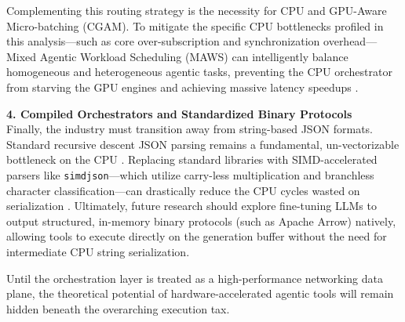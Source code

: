 \documentclass[10pt, letterpaper]{article}
\begin{document}
Complementing this routing strategy is the necessity for CPU and GPU-Aware Micro-batching (CGAM). To mitigate the specific CPU bottlenecks profiled in this analysis---such as core over-subscription and synchronization overhead---Mixed Agentic Workload Scheduling (MAWS) can intelligently balance homogeneous and heterogeneous agentic tasks, preventing the CPU orchestrator from starving the GPU engines and achieving massive latency speedups \cite{cpu_centric}.

\textbf{4. Compiled Orchestrators and Standardized Binary Protocols} \\
Finally, the industry must transition away from string-based JSON formats. Standard recursive descent JSON parsing remains a fundamental, un-vectorizable bottleneck on the CPU \cite{simdjson}. Replacing standard libraries with SIMD-accelerated parsers like \texttt{simdjson}---which utilize carry-less multiplication and branchless character classification---can drastically reduce the CPU cycles wasted on serialization \cite{simdjson}. Ultimately, future research should explore fine-tuning LLMs to output structured, in-memory binary protocols (such as Apache Arrow) natively, allowing tools to execute directly on the generation buffer without the need for intermediate CPU string serialization. 

Until the orchestration layer is treated as a high-performance networking data plane, the theoretical potential of hardware-accelerated agentic tools will remain hidden beneath the overarching execution tax.

\clearpage
\end{document}
